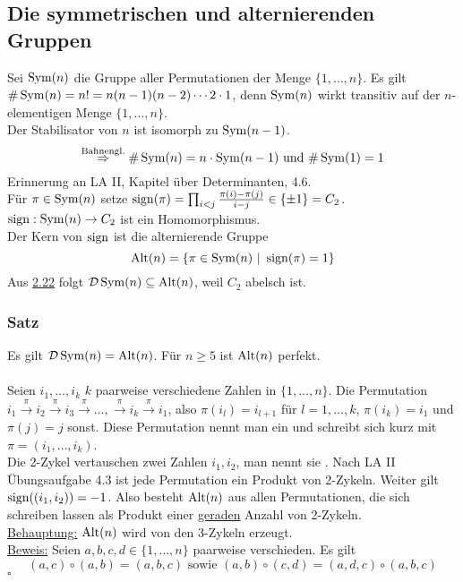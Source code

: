 \subsection{Die symmetrischen und alternierenden Gruppen}
\label{sub:sym_alt_gruppen}
Sei $\operatorname{Sym}(n)$ die Gruppe aller Permutationen der Menge $\{1,\dots,n\}$. Es gilt $\#\operatorname{Sym}(n)=n!=n(n-1)(n-2)\cdots 2 \cdot 1$, denn $\operatorname{Sym}(n)$ wirkt transitiv auf der $n$-elementigen Menge $\{1,\dots,n\}$.\\
Der Stabilisator von $n$ ist isomorph zu $\operatorname{Sym}(n-1)$.
\[
\stackrel{\text{Bahnengl.}}{\Rightarrow} \#\operatorname{Sym}(n)=n\cdot \operatorname{Sym}(n-1)\text{ und }\#\operatorname{Sym}(1)=1
\]
Erinnerung an LA II, Kapitel über Determinanten, 4.6.\\
Für $\pi\in \operatorname{Sym}(n)$ setze $\operatorname{sign}(\pi)=\prod_{i<j}\frac{\pi(i)-\pi(j)}{i-j}\in \{\pm 1\}=C_2$. \\
$\operatorname{sign}:\operatorname{Sym}(n)\to C_2$ ist ein Homomorphismus.\\
Der Kern von $\operatorname{sign}$ ist die alternierende Gruppe 
\[
\operatorname{Alt}(n)=\{\pi\in\operatorname{Sym}(n)~|~\operatorname{sign}(\pi)=1\}
\]
Aus \hyperref[sub:komutatoren]{2.22} folgt $\mathcal{D}\operatorname{Sym}(n)\subseteq \operatorname{Alt}(n)$, weil $C_2$ abelsch ist.

\subsubsection*{Satz}
Es gilt $\mathcal{D}\operatorname{Sym}(n)=\operatorname{Alt}(n)$. Für $n\ge 5$ ist $\operatorname{Alt}(n)$ perfekt.\\

\\
Seien $i_1,\dots,i_k$ $k$ paarweise verschiedene Zahlen in $\{1,\dots,n\}$. Die Permutation $i_1\stackrel{\pi}{\to} i_2\stackrel{\pi}{\to} i_3\stackrel{\pi}{\to}\dots,\stackrel{\pi}{\to} i_k\stackrel{\pi}{\to} i_1$, also $\pi(i_l)=i_{l+1}$ für $l=1,\dots,k$, $\pi(i_k)=i_1$ und $\pi(j)=j$ sonst. Diese Permutation nennt man ein  und schreibt sich kurz mit $\pi=(i_1,\dots,i_k)$.\\
Die 2-Zykel vertauschen zwei Zahlen $i_1,i_2$, man nennt sie . Nach LA II Übungsaufgabe 4.3 ist jede Permutation ein Produkt von 2-Zykeln. Weiter gilt $\operatorname{sign}((i_1,i_2))=-1$. Also besteht $\operatorname{Alt}(n)$ aus allen Permutationen, die sich schreiben lassen als Produkt einer \uline{geraden} Anzahl von 2-Zykeln.\\
\newpage
\uline{Behauptung:} $\operatorname{Alt}(n)$ wird von den 3-Zykeln erzeugt.\\
\uline{Beweis:} Seien $a,b,c,d\in \{1,\dots,n\}$ paarweise verschieden. Es gilt
\[
(a,c)\circ(a,b)=(a,b,c) \text{ sowie } (a,b)\circ (c,d)=(a,d,c)\circ (a,b,c)
\] 
\hfill $\square$

